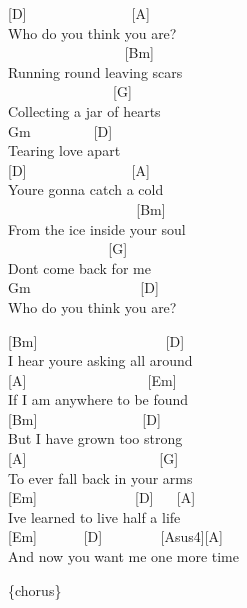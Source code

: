 \documentclass[
  letterpaper,
]{scrbook}
\begin{document}
{[}D{]} ~ ~ ~ ~ ~ ~ ~ ~ ~{[}A{]}\\
Who do you think you are?\\
\hspace*{0.333em} ~ ~ ~ ~ ~ ~ ~ ~ ~ ~ {[}Bm{]}\\
Running \textquotesingle round leaving scars\\
\hspace*{0.333em} ~ ~ ~ ~ ~ ~ ~ ~ ~ {[}G{]}\\
Collecting a jar of hearts\\
Gm ~ ~ ~ ~ ~ {[}D{]}\\
Tearing love apart\\
{[}D{]} ~ ~ ~ ~ ~ ~ ~ ~ ~{[}A{]}\\
You\textquotesingle re gonna catch a cold\\
\hspace*{0.333em} ~ ~ ~ ~ ~ ~ ~ ~ ~ ~ ~ {[}Bm{]}\\
From the ice inside your soul\\
\hspace*{0.333em} ~ ~ ~ ~ ~ ~ ~ ~ ~{[}G{]}\\
Don\textquotesingle t come back for me\\
Gm ~ ~ ~ ~ ~ ~ ~ ~ ~ {[}D{]}\\
Who do you think you are?

{[}Bm{]} ~ ~ ~ ~ ~ ~ ~ ~ ~ ~ ~{[}D{]}\\
I hear you\textquotesingle re asking all around\\
{[}A{]} ~ ~ ~ ~ ~ ~ ~ ~ ~ ~ {[}Em{]}\\
If I am anywhere to be found\\
{[}Bm{]} ~ ~ ~ ~ ~ ~ ~ ~ ~{[}D{]}\\
But I have grown too strong\\
{[}A{]} ~ ~ ~ ~ ~ ~ ~ ~ ~ ~ ~ {[}G{]}\\
To ever fall back in your arms\\
{[}Em{]} ~ ~ ~ ~ ~ ~ ~ ~ {[}D{]} ~ ~{[}A{]}\\
I\textquotesingle ve learned to live half a life\\
{[}Em{]} ~ ~ ~ ~{[}D{]} ~ ~ ~ ~ ~{[}Asus4{]}{[}A{]}\\
And now you want me one more time

\{chorus\}
\end{document}
